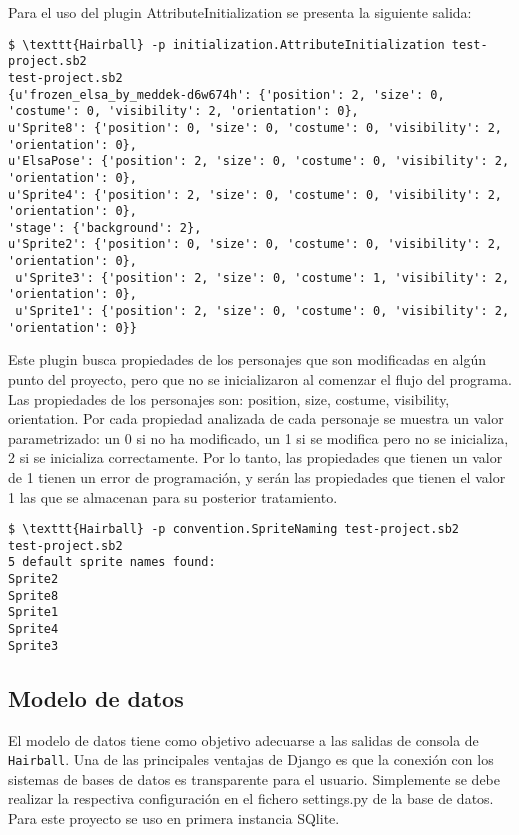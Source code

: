 \documentclass[a4paper, 12pt]{book}
\begin{document}
Para el uso del plugin AttributeInitialization se presenta la siguiente salida:

\begingroup
\fontsize{7pt}{8pt}\selectfont
\begin{verbatim}
$ \texttt{Hairball} -p initialization.AttributeInitialization test-project.sb2 
test-project.sb2
{u'frozen_elsa_by_meddek-d6w674h': {'position': 2, 'size': 0, 'costume': 0, 'visibility': 2, 'orientation': 0}, 
u'Sprite8': {'position': 0, 'size': 0, 'costume': 0, 'visibility': 2, 'orientation': 0}, 
u'ElsaPose': {'position': 2, 'size': 0, 'costume': 0, 'visibility': 2, 'orientation': 0}, 
u'Sprite4': {'position': 2, 'size': 0, 'costume': 0, 'visibility': 2, 'orientation': 0}, 
'stage': {'background': 2}, 
u'Sprite2': {'position': 0, 'size': 0, 'costume': 0, 'visibility': 2, 'orientation': 0},
 u'Sprite3': {'position': 2, 'size': 0, 'costume': 1, 'visibility': 2, 'orientation': 0},
 u'Sprite1': {'position': 2, 'size': 0, 'costume': 0, 'visibility': 2, 'orientation': 0}}
\end{verbatim}
\endgroup

Este plugin busca propiedades de los personajes que son modificadas en algún punto del 
proyecto, pero que no se inicializaron al comenzar el flujo del programa. Las propiedades 
de los personajes son: position, size, costume, visibility, orientation. Por cada propiedad
analizada de cada personaje se muestra un valor parametrizado: un 0 si no ha modificado, un
1 si se modifica pero no se inicializa, 2 si se inicializa correctamente. Por lo tanto, las
propiedades que tienen un valor de 1 tienen un error de programación, y serán las propiedades
que tienen el valor 1 las que se almacenan para su posterior tratamiento.


\begingroup
\fontsize{7pt}{8pt}\selectfont
\begin{verbatim}
$ \texttt{Hairball} -p convention.SpriteNaming test-project.sb2 
test-project.sb2
5 default sprite names found:
Sprite2
Sprite8
Sprite1
Sprite4
Sprite3
\end{verbatim}
\endgroup





\subsection{Modelo de datos}
El modelo de datos tiene como objetivo adecuarse a las salidas de consola de \texttt{Hairball}. Una de las principales
ventajas de Django es que la conexión con los sistemas de bases de datos es transparente para el usuario. 
Simplemente se debe realizar la respectiva configuración en el fichero settings.py de la base de datos. Para
este proyecto se uso en primera instancia SQlite.
\end{document}
